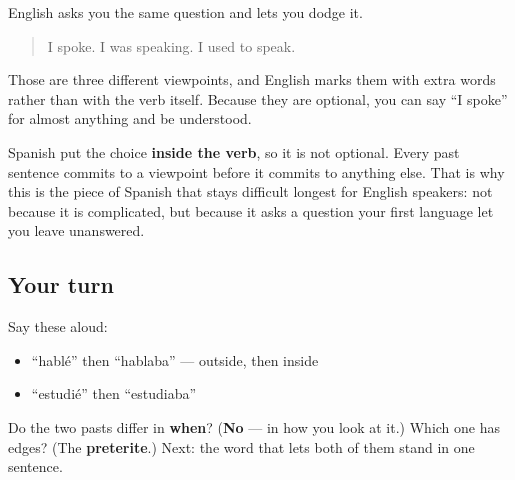 \begin{culture}
English asks you the same question and lets you dodge it.

\begin{quote}
I spoke. I was speaking. I used to speak.
\end{quote}

Those are three different viewpoints, and English marks them with extra words rather than with the verb itself. Because they are optional, you can say \textquotedblleft{}I spoke\textquotedblright{} for almost anything and be understood.

Spanish put the choice \textbf{inside the verb}, so it is not optional. Every past sentence commits to a viewpoint before it commits to anything else. That is why this is the piece of Spanish that stays difficult longest for English speakers: not because it is complicated, but because it asks a question your first language let you leave unanswered.
\end{culture}

\subsection*{Your turn}
Say these aloud:

\begin{itemize}
\raggedright
  \item \textquotedblleft{}hablé\textquotedblright{} then \textquotedblleft{}hablaba\textquotedblright{} — outside, then inside
  \item \textquotedblleft{}estudié\textquotedblright{} then \textquotedblleft{}estudiaba\textquotedblright{}
\end{itemize}

\begin{tcolorbox}[breakable,colback=teal!4,colframe=teal!35!black,title={Before you move on}]
Do the two pasts differ in \textbf{when}? (\textbf{No} — in how you look at it.) Which one has edges? (The \textbf{preterite}.) Next: the word that lets both of them stand in one sentence.
\end{tcolorbox}

